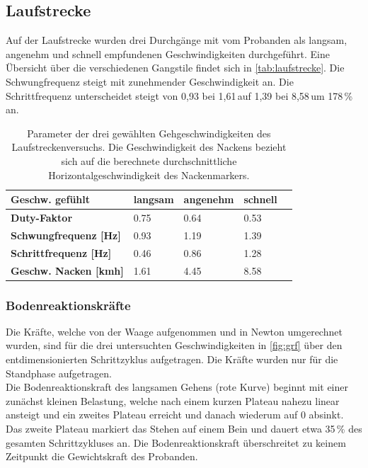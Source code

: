 \subsection{Laufstrecke}
Auf der Laufstrecke wurden drei Durchgänge mit vom Probanden als langsam, angenehm und schnell empfundenen Geschwindigkeiten durchgeführt. Eine Übersicht über die verschiedenen Gangstile findet sich in \autoref{tab:laufstrecke}. 
Die Schwungfrequenz steigt mit zunehmender Geschwindigkeit an. Die Schrittfrequenz unterscheidet steigt von 0,93 bei 1,61\,\kmh auf 1,39 bei 8,58\,\kmh um 178\,\% an. 

 \begin{table}[h!]
	\centering
	\caption[Übersicht Laufstrecke]{Parameter der drei gewählten Gehgeschwindigkeiten des Laufstreckenversuchs. Die Geschwindigkeit des Nackens bezieht sich auf die berechnete durchschnittliche Horizontalgeschwindigkeit des Nackenmarkers.}
	\label{tab:laufstrecke}
	\begin{tabular}{L{4.5cm}C{1.5cm}C{2cm}C{2cm}C{2cm}}
		\toprule
		\textbf{Geschw. gefühlt}& langsam & angenehm & schnell \\
		\midrule
		\textbf{Duty-Faktor}	& 0.75 & 0.64 & 0.53 \\
		\textbf{Schwungfrequenz [Hz]} & 0.93 & 1.19 & 1.39 \\
		\textbf{Schrittfrequenz [Hz]} & 0.46 & 0.86 & 1.28 \\
		\textbf{Geschw. Nacken [kmh]}& 1.61 & 4.45 & 8.58 \\
		\bottomrule
		
	\end{tabular}
\end{table}

\subsubsection{Bodenreaktionskräfte}
Die Kräfte, welche von der Waage aufgenommen und in Newton umgerechnet wurden, sind für die drei untersuchten Geschwindigkeiten in \autoref{fig:grf} über den entdimensionierten Schrittzyklus aufgetragen. Die Kräfte wurden nur für die Standphase aufgetragen.\\
Die Bodenreaktionskraft des langsamen Gehens (rote Kurve) beginnt mit einer zunächst kleinen Belastung, welche nach einem kurzen Plateau nahezu linear ansteigt und ein zweites Plateau erreicht und danach wiederum auf 0 absinkt. Das zweite Plateau markiert das Stehen auf einem Bein und dauert etwa 35\,\% des gesamten Schrittzykluses an. Die Bodenreaktionskraft überschreitet zu keinem Zeitpunkt die Gewichtskraft des Probanden.\\

